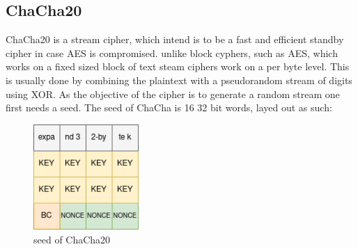 \documentclass[a4paper]{article}
\begin{document}
\begin{enumerate}
\subsection{ChaCha20}
\label{ChaChaalg}
ChaCha20 is a stream cipher, which intend is to be a fast and efficient standby cipher in case AES is compromised. unlike block cyphers, such as AES, which works on a fixed sized block of text steam ciphers work on a per byte level. This is usually done by combining the plaintext with a pseudorandom stream of digits using XOR. As the objective of the cipher is to generate a random stream one first needs a seed. The seed of ChaCha is 16 32 bit words, layed out as such:
\begin{figure}[htbp]
\centering
\includegraphics[width=4cm]{./Background/ChaChaSeed.png}
\caption{\label{fig:ChaChaSeed}seed of ChaCha20}
\end{figure}


\end{enumerate}
\end{document}
